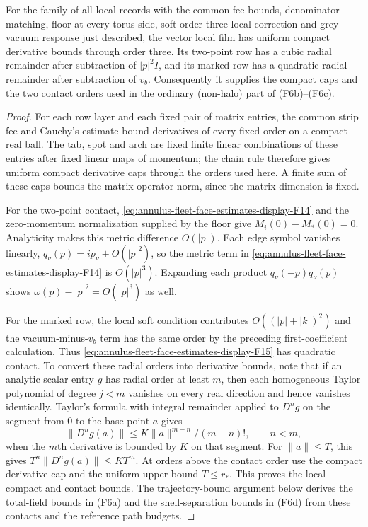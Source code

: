 \begin{lemma}
\label{lem:ex-row-to-floe}
For the family of all local records with the common fee bounds,
denominator matching, floor at every torus side, soft order-three local
correction and grey vacuum response just described, the vector local
film has uniform
compact derivative bounds through order three. Its two-point row has a
cubic radial remainder after subtraction of $|p|^2I$, and its marked
row has a quadratic radial remainder after subtraction of $v_b$.
Consequently it supplies the compact caps and the two contact orders
used in the ordinary (non-halo) part of (F6b)--(F6c).
\end{lemma}
\begin{proof}
For each row layer and each fixed pair of matrix entries, the common
strip fee and Cauchy's estimate bound derivatives of every fixed order
on a compact real ball. The tab, spot and arch are fixed finite linear
combinations of these entries after fixed linear maps of momentum; the
chain rule therefore gives uniform compact derivative caps through the
orders used here. A finite sum of these caps bounds the matrix operator
norm, since the matrix dimension is fixed.

For the two-point contact, \eqref{eq:annulus-fleet-face-estimates-display-F14} and the zero-momentum normalization
supplied by the floor give $M_i(0)-M_*(0)=0$. Analyticity makes this metric difference $O(|p|)$.
Each edge symbol vanishes linearly, $q_\nu(p)=ip_\nu+O(|p|^2)$, so the
metric term in \eqref{eq:annulus-fleet-face-estimates-display-F14} is $O(|p|^3)$. Expanding each product
$q_\nu(-p)q_\nu(p)$ shows $\omega(p)-|p|^2=O(|p|^3)$ as well.

For the marked row, the local soft condition contributes $O((|p|+|k|)^2)$
and the vacuum-minus-$v_b$ term has the same order by the preceding
first-coefficient calculation. Thus \eqref{eq:annulus-fleet-face-estimates-display-F15} has quadratic contact.
To convert these radial orders into derivative bounds, note that if an
analytic scalar entry $g$ has radial order at least $m$, then each
homogeneous Taylor polynomial of degree $j<m$ vanishes on every real
direction and hence vanishes identically. Taylor's formula with integral
remainder applied to $D^n g$ on the segment from $0$ to the base point
$a$ gives
\[
 \|D^n g(a)\|\leq K\|a\|^{m-n}/(m-n)!,\qquad n<m,
\]
when the $m$th derivative is bounded by $K$ on that segment. For
$\|a\|\leq T$, this gives $T^n\|D^ng(a)\|\leq KT^m$. At orders
above the contact order use the compact derivative cap and the uniform
upper bound $T\leq r_*$. This proves the local compact and contact
bounds. The trajectory-bound argument below derives the total-field
bounds in (F6a) and the shell-separation bounds in (F6d) from these
contacts and the reference path budgets.
\end{proof}

